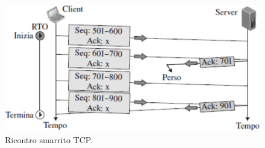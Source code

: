 \begin{figure}
    \centering
    \includegraphics[scale=0.28]{Immagini/TCPRiscontroSmarrito.png}
    \caption{Ricontro smarrito TCP.}
\end{figure}

\newblock\\\\\\\\\\\\\\\\\\\\\\\\
